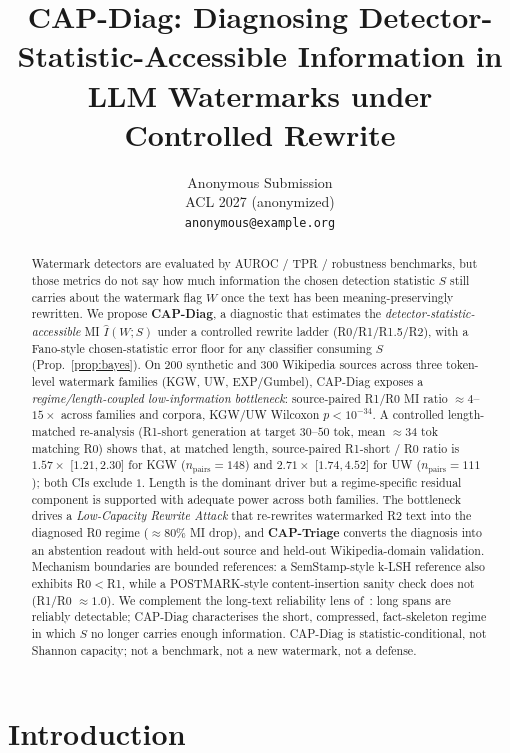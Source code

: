 \documentclass[11pt]{article}
\title{CAP-Diag: Diagnosing Detector-Statistic-Accessible Information
in LLM Watermarks under Controlled Rewrite}
\author{Anonymous Submission \\
  ACL 2027 (anonymized) \\
  \texttt{anonymous@example.org}}
\begin{document}
\maketitle

\begin{abstract}
Watermark detectors are evaluated by AUROC / TPR / robustness benchmarks, but
those metrics do not say how much information the chosen detection statistic
$S$ still carries about the watermark flag $W$ once the text has been
meaning-preservingly rewritten. We propose \textbf{CAP-Diag}, a diagnostic
that estimates the \emph{detector-statistic-accessible} MI $\hat I(W;S)$
under a controlled rewrite ladder (R0/R1/R1.5/R2), with a Fano-style
chosen-statistic error floor for any classifier consuming $S$
(Prop.~\ref{prop:bayes}). On $200$ synthetic and $300$ Wikipedia sources
across three token-level watermark families (KGW, UW, EXP/Gumbel),
CAP-Diag exposes a \emph{regime/length-coupled low-information bottleneck}:
source-paired R1/R0 MI ratio $\approx 4$--$15\times$ across families and
corpora, KGW/UW Wilcoxon $p<10^{-34}$. A controlled length-matched re-analysis (R1-short generation at target
$30$--$50$ tok, mean $\approx 34$ tok matching R0) shows that, at matched
length, source-paired R1-short / R0 ratio is $1.57\times$ [$1.21, 2.30$]
for KGW ($n_{\mathrm{pairs}}=148$) and $2.71\times$ [$1.74, 4.52$] for UW
($n_{\mathrm{pairs}}=111$); both CIs exclude $1$. Length is the dominant
driver but a regime-specific residual component is supported with
adequate power across both families. The bottleneck drives a \emph{Low-Capacity Rewrite Attack}
that re-rewrites watermarked R2 text into the diagnosed R0 regime
($\approx 80\%$ MI drop), and \textbf{CAP-Triage} converts the diagnosis
into an abstention readout with held-out source and held-out
Wikipedia-domain validation. Mechanism boundaries are bounded references:
a SemStamp-style k-LSH reference also exhibits R0$<$R1, while a
POSTMARK-style content-insertion sanity check does not (R1/R0
$\approx 1.0$). We complement the long-text reliability lens
of~\citet{kirchenbauer2024reliability}: long spans are reliably detectable;
CAP-Diag characterises the short, compressed, fact-skeleton regime in
which $S$ no longer carries enough information. CAP-Diag is
statistic-conditional, not Shannon capacity; not a benchmark, not a new
watermark, not a defense.
\end{abstract}

\section{Introduction}
\label{sec:intro}
\end{document}
